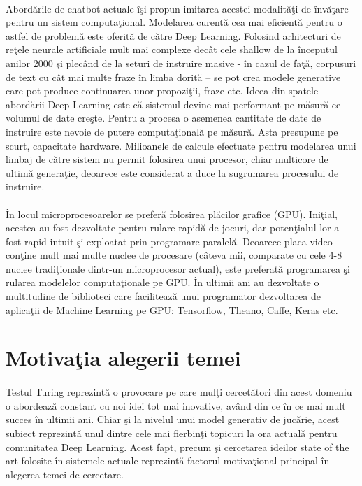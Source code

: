 \paragraph{}
Abord\u arile de chatbot actuale \^ i\c si propun imitarea acestei modalit\u a\c ti de \^ inv\u a\c tare pentru un sistem computa\c tional. Modelarea curent\u a cea mai eficient\u a pentru o astfel de problem\u a este oferit\u a de c\u atre Deep Learning. Folosind arhitecturi de re\c tele neurale artificiale mult mai complexe dec\^ at cele shallow de la \^ inceputul anilor 2000 \c si plec\^ and de la seturi de instruire masive - \^ in cazul de fa\c t\u a, corpusuri de text cu c\^ at mai multe fraze \^ in limba dorit\u a – se pot crea modele generative care pot produce continuarea unor propozi\c tii, fraze etc. Ideea din spatele abord\u arii Deep Learning este c\u a sistemul devine mai performant pe m\u asur\u a ce volumul de date cre\c ste. Pentru a procesa o asemenea cantitate de date de instruire este nevoie de putere computa\c tional\u a pe m\u asur\u a. Asta presupune pe scurt, capacitate hardware. Milioanele de calcule efectuate pentru modelarea unui limbaj de c\u atre sistem nu permit folosirea unui procesor, chiar multicore de ultim\u a genera\c tie, deoarece este considerat a duce la sugrumarea procesului de instruire.

\paragraph{}
\^ In locul microprocesoarelor se prefer\u a folosirea pl\u acilor grafice (GPU). Ini\c tial, acestea au fost dezvoltate pentru rulare rapid\u a de jocuri, dar poten\c tialul lor a fost rapid intuit \c si exploatat prin programare paralel\u a. Deoarece placa video con\c tine mult mai multe nuclee de procesare (c\^ ateva mii, comparate cu cele 4-8 nuclee tradi\c tionale dintr-un microprocesor actual), este preferat\u a programarea \c si rularea modelelor computa\c tionale pe GPU. \^ In ultimii ani au dezvoltate o multitudine de biblioteci care faciliteaz\u a unui programator dezvoltarea de aplica\c tii de Machine Learning pe GPU: Tensorflow, Theano, Caffe, Keras etc.

\section{Motiva\c tia alegerii temei}

\paragraph{}
Testul Turing reprezint\u a o provocare pe care mul\c ti cercet\u atori din acest domeniu o abordeaz\u a constant cu noi idei tot mai inovative, av\^ and din ce \^ in ce mai mult succes \^ in ultimii ani. Chiar \c si la nivelul unui model generativ de juc\u arie, acest subiect reprezint\u a unul dintre cele mai fierbin\c ti topicuri la ora actual\u a pentru comunitatea Deep Learning. Acest fapt, precum \c si cercetarea ideilor state of the art folosite \^ in sistemele actuale reprezint\u a factorul motiva\c tional principal \^ in alegerea temei de cercetare.

